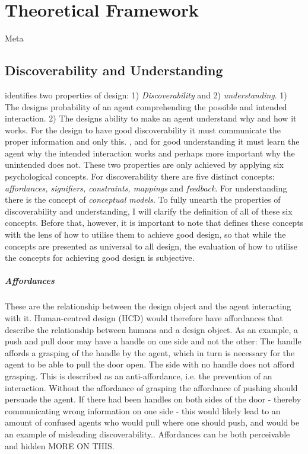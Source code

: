 \chapter{Theoretical Framework}

Meta

\section{Discoverability and Understanding}
 identifies two properties of design: 1) \textit{Discoverability} and 2) \textit{understanding}. 1) The designs probability of an agent comprehending the possible and intended interaction. 2) The designs ability to make an agent understand why and how it works. For the design to have good discoverability it must communicate the proper information and only this. , and for good understanding it must learn the agent why the intended interaction works and perhaps more important why the unintended does not. These two properties are only achieved by applying six psychological concepts. For discoverability there are five distinct concepts: \textit{affordances, signifiers, constraints, mappings} and \textit{feedback}. For understanding there is the concept of \textit{conceptual models}. To fully unearth the properties of discoverability and understanding, I will clarify the definition of all of these six concepts. Before that, however, it is important to note that  defines these concepts with the lens of how to utilise them to achieve good design, so that while the concepts are presented as universal to all design, the evaluation of how to utilise the concepts for achieving good design is subjective.
\paragraph{Affordances} These are the relationship between the design object and the agent interacting with it. Human-centred design (HCD) would therefore have affordances that describe the relationship between humans and a design object. As an example, a push and pull door may have a handle on one side and not the other: The handle affords a grasping of the handle by the agent, which in turn is necessary for the agent to be able to pull the door open. The side with no handle does not afford grasping. This is described as an anti-affordance, i.e. the prevention of an interaction. Without the affordance of grasping the affordance of pushing should persuade the agent. If there had been handles on both sides of the door - thereby communicating wrong information on one side - this would likely lead to an amount of confused agents who would pull where one should push, and would be an example of misleading discoverability.\cite{norman}. Affordances can be both perceivable and hidden MORE ON THIS.
